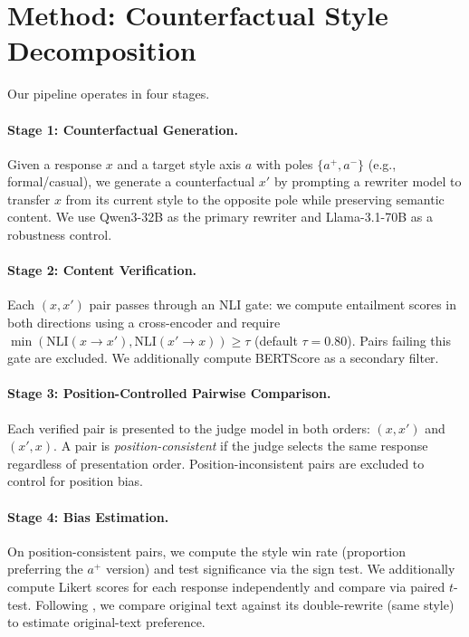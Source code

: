 \documentclass[11pt,a4paper]{article}
\begin{document}
\section{Method: Counterfactual Style Decomposition}
\label{sec:method}

Our pipeline operates in four stages.

\paragraph{Stage 1: Counterfactual Generation.}
Given a response $x$ and a target style axis $a$ with poles $\{a^+, a^-\}$ (e.g., formal/casual), we generate a counterfactual $x'$ by prompting a rewriter model to transfer $x$ from its current style to the opposite pole while preserving semantic content. We use Qwen3-32B as the primary rewriter and Llama-3.1-70B as a robustness control.

\paragraph{Stage 2: Content Verification.}
Each $(x, x')$ pair passes through an NLI gate: we compute entailment scores in both directions using a cross-encoder and require $\min(\text{NLI}(x \to x'), \text{NLI}(x' \to x)) \geq \tau$ (default $\tau = 0.80$). Pairs failing this gate are excluded. We additionally compute BERTScore as a secondary filter.

\paragraph{Stage 3: Position-Controlled Pairwise Comparison.}
Each verified pair is presented to the judge model in both orders: $(x, x')$ and $(x', x)$. A pair is \emph{position-consistent} if the judge selects the same response regardless of presentation order. Position-inconsistent pairs are excluded to control for position bias.

\paragraph{Stage 4: Bias Estimation.}
On position-consistent pairs, we compute the style win rate (proportion preferring the $a^+$ version) and test significance via the sign test. We additionally compute Likert scores for each response independently and compare via paired $t$-test. Following \citet{rate2025}, we compare original text against its double-rewrite (same style) to estimate original-text preference.
\end{document}
